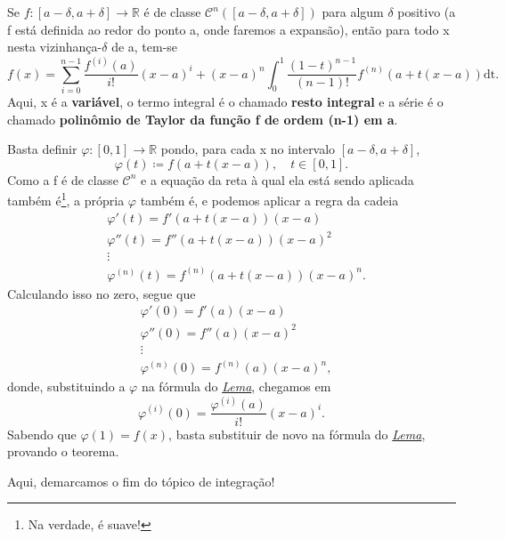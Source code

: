 \documentclass[../analysisII_notes.tex]{subfiles}
\begin{document}
\hypertarget{taylor_formula}{
	\begin{theorem*}
		Se \(f:[a-\delta , a+\delta ]\rightarrow \mathbb{R}\) é de classe \(\mathcal{C}^{n}([a-\delta , a+\delta ])\) para algum \(\delta \) positivo (a f está definida ao redor do ponto a, onde faremos a expansão), então para todo x nesta vizinhança-\(\delta \) de a, tem-se
		\[
			f(x) =\sum\limits_{i=0}^{n-1}\frac{f^{(i)}(a)}{i!}(x-a)^{i} + (x-a)^{n}\int_{0}^{1}\frac{(1-t)^{n-1}}{(n-1)!}f^{(n)}(a+t(x-a)) \mathrm{dt}.
		\]
		Aqui, x é a \textbf{variável}, o termo integral é o chamado \textbf{resto integral} e a série é o chamado \textbf{polinômio de Taylor da função f de ordem (n-1) em a}.
	\end{theorem*}
}
\begin{proof*}
	Basta definir \(\varphi :[0, 1]\rightarrow \mathbb{R}\) pondo, para cada x no intervalo \([a-\delta , a+\delta ]\),
	\[
		\varphi (t)\coloneqq f(a+t(x-a)),\quad t\in[0, 1].
	\]
	Como a f é de classe \(\mathcal{C}^{n}\) e a equação da reta à qual ela está sendo aplicada também é\footnote{Na verdade, é suave!}, a própria \(\varphi \) também é, e podemos aplicar a regra da cadeia
	\begin{align*}
		 & \varphi '(t) = f'(a+t(x-a))(x-a)               \\
		 & \varphi''(t) = f''(a+t(x-a))(x-a)^{2}          \\
		 & \vdots                                         \\
		 & \varphi^{(n)}(t) = f^{(n)}(a+t(x-a))(x-a)^{n}.
	\end{align*}
	Calculando isso no zero, segue que
	\begin{align*}
		 & \varphi '(0) = f'(a)(x-a)               \\
		 & \varphi''(0) = f''(a)(x-a)^{2}          \\
		 & \vdots                                  \\
		 & \varphi^{(n)}(0) = f^{(n)}(a)(x-a)^{n},
	\end{align*}
	donde, substituindo a \(\varphi\) na fórmula do \hyperlink{lemma_taylor}{\textit{Lema}}, chegamos em
	\[
		\varphi^{(i)}(0) = \frac{\varphi^{(i)}(a)}{i!}(x-a)^{i}.
	\]
	Sabendo que \(\varphi (1) = f(x)\), basta substituir de novo na fórmula do \hyperlink{lemma_taylor}{\textit{Lema}}, provando o teorema. \qedsymbol
\end{proof*}
Aqui, demarcamos o fim do tópico de integração!
\end{document}
